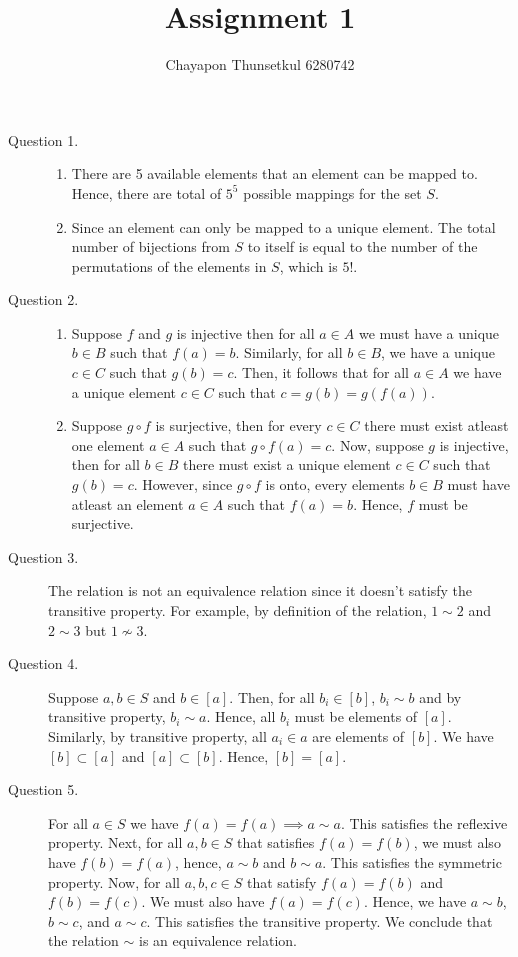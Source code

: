 \documentclass[]{article}
\title{Assignment 1}
\author{Chayapon Thunsetkul 6280742}
\begin{document}
\maketitle
\begin{description}
    \item[Question 1.] 
    \begin{enumerate}
        \item There are 5 available elements that an element can be mapped to. Hence, there are total of $5^5$ possible mappings for the set $S$.
        \item Since an element can only be mapped to a unique element. The total number of bijections from $S$ to itself is equal to the number of the permutations of the elements in $S$, which is $5!$.
    \end{enumerate} 
    \item[Question 2.]
    \begin{enumerate}
        \item Suppose $f$ and $g$ is injective then for all $a \in A$ we must have a unique $b \in B$ such that $f(a) = b$. Similarly, for all $b\in B$, we have a unique $c \in C$ such that $g(b) = c$. Then, it follows that for all $a \in A$ we have a unique element $c \in C$ such that $c = g(b) = g(f(a))$.
        \item Suppose $g \circ f$ is surjective, then for every $c \in C$ there must exist atleast one element $a \in A$ such that $g \circ f (a) = c$. Now, suppose $g$ is injective, then for all $b \in B$ there must exist a unique element $c \in C$ such that $g(b) = c$. However, since $g \circ f$ is onto, every elements $b \in B$ must have atleast an element $a \in A$ such that $f(a) = b$. Hence, $f$ must be surjective.
    \end{enumerate}
    \item[Question 3.] The relation is not an equivalence relation since it doesn't satisfy the transitive property. For example, by definition of the relation, $1 \sim 2$ and $2\sim3 $ but $1 \not\sim 3$.
    \item[Question 4.] Suppose $a,b \in S$ and $b \in [a]$. Then, for all $b_i \in [b]$, $b_i \sim b$ and by transitive property, $b_i \sim a$. Hence, all $b_i$ must be elements of $[a]$. Similarly, by transitive property, all $a_i \in a$ are elements of $[b]$. We have $[b] \subset [a]$ and $[a] \subset [b]$. Hence, $[b] = [a]$.
    \item[Question 5.] For all $a \in S$ we have $f(a) = f(a) \implies a\sim a$. This satisfies the reflexive property. Next, for all $a,b \in S$ that satisfies $f(a) = f(b)$, we must also have $f(b) = f(a)$, hence, $a \sim b$ and $b \sim a$. This satisfies the symmetric property. Now, for all $a,b,c\in S$ that satisfy $f(a) = f(b)$ and $f(b) = f(c)$. We must also have $f(a) = f(c)$. Hence, we have $a \sim b$, $b \sim c$, and $a \sim c$. This satisfies the transitive property. We conclude that the relation $\sim$ is an equivalence relation.

\end{description}
\end{document}
